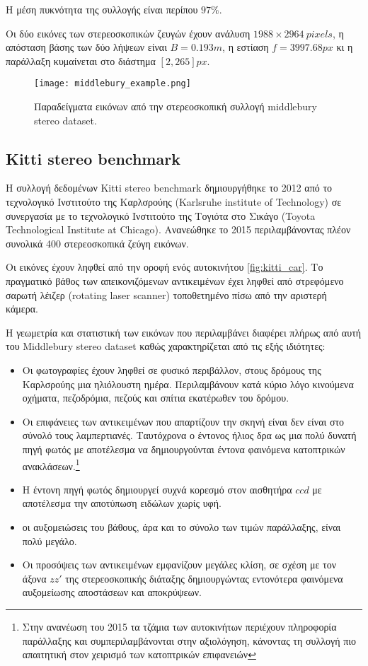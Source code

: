 Η μέση πυκνότητα της συλλογής είναι περίπου $97\%$.

Οι δύο εικόνες των στερεοσκοπικών ζευγών έχουν ανάλυση $1988\times2964 \: pixels$, η απόσταση βάσης των δύο λήψεων είναι $B=0.193m$, η εστίαση $f=3997.68 px$ κι η παράλλαξη κυμαίνεται στο διάστημα $[2,265]px$.

\begin{figure}
	\centering
	\texttt{[image: middlebury\_example.png]}
	\caption{Παραδείγματα εικόνων από την στερεοσκοπική συλλογή \e middlebury stereo dataset. \g}
	\label{fig:middlebury_example}
\end{figure}

\e
\subsection{Kitti stereo benchmark}
\g

Η συλλογή δεδομένων \e Kitti stereo benchmark \g δημιουργήθηκε το 2012 \cite{geiger2012we} από το τεχνολογικό Ινστιτούτο της Καρλσρούης \e (Karlsruhe institute of Technology) \g σε συνεργασία με το τεχνολογικό Ινστιτούτο της Τογιότα στο Σικάγο \e (Toyota Technological Institute at Chicago). \g Ανανεώθηκε το 2015 \citep{menze2015object} περιλαμβάνοντας πλέον συνολικά 400 στερεοσκοπικά ζεύγη εικόνων.

Οι εικόνες έχουν ληφθεί από την οροφή ενός αυτοκινήτου \ref{fig:kitti_car}. Το πραγματικό βάθος των απεικονιζόμενων αντικειμένων έχει ληφθεί από στρεφόμενο σαρωτή λέιζερ \e (rotating laser scanner) \g τοποθετημένο πίσω από την αριστερή κάμερα.

Η γεωμετρία και στατιστική των εικόνων που περιλαμβάνει διαφέρει πλήρως από αυτή του \e Middlebury stereo dataset \g καθώς χαρακτηρίζεται από τις εξής ιδιότητες:

\begin{itemize}
	\item Οι φωτογραφίες έχουν ληφθεί σε φυσικό περιβάλλον, στους δρόμους της Καρλσρούης μια ηλιόλουστη ημέρα. Περιλαμβάνουν κατά κύριο λόγο κινούμενα οχήματα, πεζοδρόμια, πεζούς και σπίτια εκατέρωθεν του δρόμου.
	\item Οι επιφάνειες των αντικειμένων που απαρτίζουν την σκηνή είναι δεν είναι στο σύνολό τους λαμπερτιανές. Ταυτόχρονα ο έντονος ήλιος δρα ως μια πολύ δυνατή πηγή φωτός με αποτέλεσμα να δημιουργούνται έντονα φαινόμενα κατοπτρικών ανακλάσεων.\footnote{Στην ανανέωση του 2015 τα τζάμια των αυτοκινήτων περιέχουν πληροφορία παράλλαξης και συμπεριλαμβάνονται στην αξιολόγηση, κάνοντας τη συλλογή πιο απαιτητική στον χειρισμό των κατοπτρικών επιφανειών}
	\item Η έντονη πηγή φωτός δημιουργεί συχνά κορεσμό στον αισθητήρα $ccd$ με αποτέλεσμα την αποτύπωση ειδώλων χωρίς υφή.
	\item οι αυξομειώσεις του βάθους, άρα και το σύνολο των τιμών παράλλαξης, είναι πολύ μεγάλο.
	\item Οι προσόψεις των αντικειμένων εμφανίζουν μεγάλες κλίση, σε σχέση με τον άξονα $zz'$ της στερεοσκοπικής διάταξης δημιουργώντας εντονότερα φαινόμενα αυξομείωσης αποστάσεων και αποκρύψεων.
\end{itemize}

